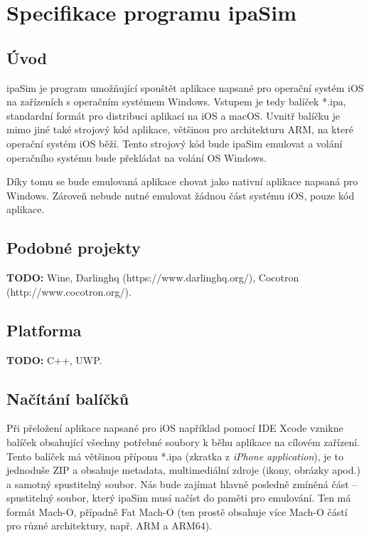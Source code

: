 \documentclass[12pt]{article}
\begin{document}
\section*{Specifikace programu ipaSim}

\subsection*{Úvod}

ipaSim je program umožňující spouštět aplikace napsané pro operační systém iOS na zařízeních s operačním systémem Windows.
Vstupem je tedy balíček *.ipa, standardní formát pro distribuci aplikací na iOS a macOS.
Uvnitř balíčku je mimo jiné také strojový kód aplikace, většinou pro architekturu ARM, na které operační systém iOS běží.
Tento strojový kód bude ipaSim emulovat a volání operačního systému bude překládat na volání OS Windows.

Díky tomu se bude emulovaná aplikace chovat jako nativní aplikace napsaná pro Windows.
Zároveň nebude nutné emulovat žádnou část systému iOS, pouze kód aplikace.

\subsection*{Podobné projekty}

\textbf{TODO:} Wine, Darlinghq (https://www.darlinghq.org/), Cocotron (http://www.cocotron.org/).

\subsection*{Platforma}

\textbf{TODO:} C++, UWP.

\subsection*{Načítání balíčků}

Při přeložení aplikace napsané pro iOS například pomocí IDE Xcode vznikne balíček obsahující všechny potřebné soubory k běhu aplikace na cílovém zařízení.
Tento balíček má většinou příponu *.ipa (zkratka z \textit{iPhone application}), je to jednoduše ZIP a obsahuje metadata, multimediální zdroje (ikony, obrázky apod.) a samotný spustitelný soubor.
Nás bude zajímat hlavně posledně zmíněná část -- spustitelný soubor, který ipaSim musí načíst do paměti pro emulování.
Ten má formát Mach-O, případně Fat Mach-O (ten prostě obsahuje více Mach-O částí pro různé architektury, např. ARM a ARM64).
\end{document}
